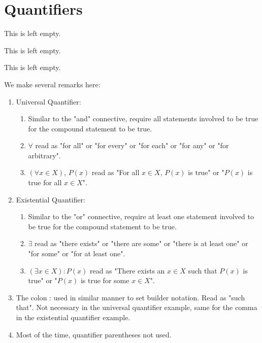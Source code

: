 \section{Quantifiers}

\begin{remark}
    This is left empty.
\end{remark}

\begin{example}
    This is left empty.
\end{example}

\begin{definition}
    This is left empty.
\end{definition}

\begin{remark}
    We make several remarks here:

    \begin{enumerate}
        \item Universal Quantifier:
            \begin{enumerate}[label=(\alph*)]
                \item Similar to the "and" connective, require all statements involved to be true for the compound statement to be true.
                \item $\forall$ read as "for all" or "for every" or "for each" or "for any" or "for arbitrary".
                \item $(\forall x \in X)$, $P(x)$ read as "For all $x \in X$, $P(x)$ is true" or "$P(x)$ is true for all $x \in X$".
            \end{enumerate}
        \item Existential Quantifier:
            \begin{enumerate}[label=(\alph*)]
                \item Similar to the "or" connective, require at least one statement involved to be true for the compound statement to be true.
                \item $\exists$ read as "there exists" or "there are some" or "there is at least one" or "for some" or "for at least one".
                \item $(\exists x \in X): P(x)$ read as "There exists an $x \in X$ such that $P(x)$ is true" or "$P(x)$ is true for some $x \in X$".
            \end{enumerate}
        \item The colon : used in similar manner to set builder notation. Read as "such that". Not necessary in the universal quantifier example, same for the comma in the existential quantifier example.
        \item Most of the time, quantifier parentheses not used.
    \end{enumerate}
\end{remark}


